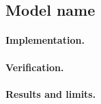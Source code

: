 \subsection{Model name}
\label{sec:model_id}
\paragraph{Implementation.} %
\paragraph{Verification.} %
\paragraph{Results and limits.} %
